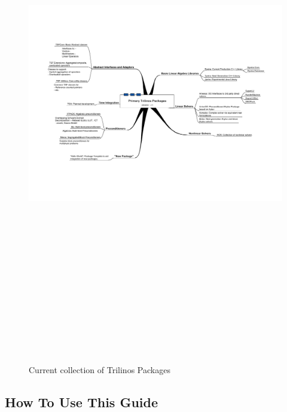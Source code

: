 \documentclass[12pt,relax]{TrilinosDevGuide}
\begin{document}
\begin{figure}
\begin{center}
\includegraphics[height=9in]{TrilinosPackagesDiagram}
\end{center}
\label{Figure:TrilinosPackages}
\caption{Current collection of Trilinos Packages}
\end{figure}

\subsection{How To Use This Guide}
\end{document}
